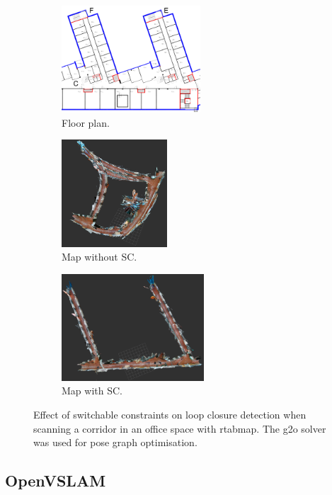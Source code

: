 \documentclass[11pt, letterpaper, twoside]{article}
\begin{document}
\begin{figure}[tb]
    \begin{subfigure}[t]{.34\textwidth}
        \centering
        \includegraphics[height=4cm]{corridor}
        \caption{Floor plan.}\label{fig:rtabmap_lc_floorplan}
    \end{subfigure}%
    \begin{subfigure}[t]{.19\textwidth}
        \centering
        \includegraphics[height=4cm]{rtabmap_without_sc.png}
        \caption{Map without SC.}\label{fig:rtabmap_lc_without_sc}
    \end{subfigure}%
    \begin{subfigure}[t]{.44\textwidth}
        \centering
        \includegraphics[height=4cm]{rtabmap_with_sc.png}
        \caption{Map with SC.}\label{fig:rtabmap_lc_with_sc}
    \end{subfigure}

    \caption{%
        Effect of switchable constraints on loop closure detection when
        scanning a corridor in an office space with \gls{rtabmap}. The g2o
        solver was used for pose graph optimisation.
    }\label{fig:rtabmap_lc}
\end{figure}

\subsection{OpenVSLAM}
\end{document}
